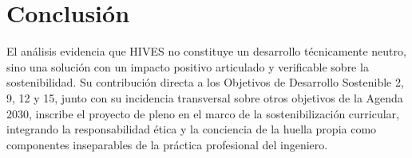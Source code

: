 \section{Conclusión}
 
El análisis evidencia que HIVES no constituye un desarrollo técnicamente neutro,
sino una solución con un impacto positivo articulado y verificable sobre la
sostenibilidad. Su contribución directa a los Objetivos de Desarrollo Sostenible
2, 9, 12 y 15, junto con su incidencia transversal sobre otros objetivos de la
Agenda 2030, inscribe el proyecto de pleno en el marco de la sostenibilización
curricular, integrando la responsabilidad ética y la conciencia de la huella
propia como componentes inseparables de la práctica profesional del ingeniero.